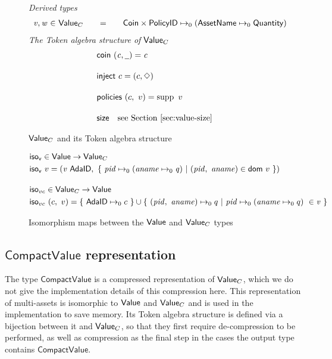 \begin{figure*}[t!]
  \emph{Derived types}
  \begin{equation*}
    \begin{array}{r@{~\in~}l@{\qquad=\qquad}lr}
      \var{v}, \var{w} & \Value_C
      & \Coin \times \PolicyID \mapsto_0 ( \AssetName \mapsto_0 \Quantity )
    \end{array}
  \end{equation*}
  \emph{The Token algebra structure of $\mathsf{Value}_C$}
  \begin{align*}
    & \fun{coin}~(\var{c}, \wcard) = \var{c}
    \nextdef
    & \fun{inject}~c  = (c, \Nothing)
    \nextdef
    & \fun{policies}~(c,~v) = \supp{~v}
    \nextdef
    & \fun{size} ~~~ \text{see Section \ref{sec:value-size}}
  \end{align*}
  \caption{$\mathsf{Value}_C$ and its Token algebra structure}
  \label{fig:special-ada}
\end{figure*}

\begin{figure*}[t!]
  \begin{align*}
    & \fun{iso_v} \in \Value \to \Value_C \\
    & \fun{iso_v}~v =(\var{v}~\mathsf{AdaID},~\{~\var{pid}\mapsto_0(\var{aname}\mapsto_0\var{q})~
    \vert~(\var{pid},~\var{aname})\in\fun{dom}~{v}~\})
    \nextdef
    & \fun{iso}_{vc} \in \Value_C \to \Value \\
    & \fun{iso}_{vc}~(c, ~v) = \{~\mathsf{AdaID}\mapsto_0c~\}\cup
     \{~(\var{pid},~\var{aname})\mapsto_0q~\vert~\var{pid}\mapsto_0(\var{aname}\mapsto_0q)~ \in \var{v}~\}
  \end{align*}
  \caption{Isomorphism maps between the $\mathsf{Value}$ and $\mathsf{Value}_C$ types}
  \label{fig:iso-v}
\end{figure*}

\subsection{$\mathsf{CompactValue}$ representation}
The type $\mathsf{CompactValue}$ is a compressed representation of $\mathsf{Value}_C$,
which we do not give the implementation details of this compression here.
This representation of multi-assets is isomorphic to $\mathsf{Value}$ and $\mathsf{Value}_C$
and is used in the implementation to save memory. Its Token algebra structure
is defined via a bijection between it and $\mathsf{Value}_C$,
so that they first require de-compression to be performed, as well as compression
as the final step in the cases the output type contains $\mathsf{CompactValue}$.

